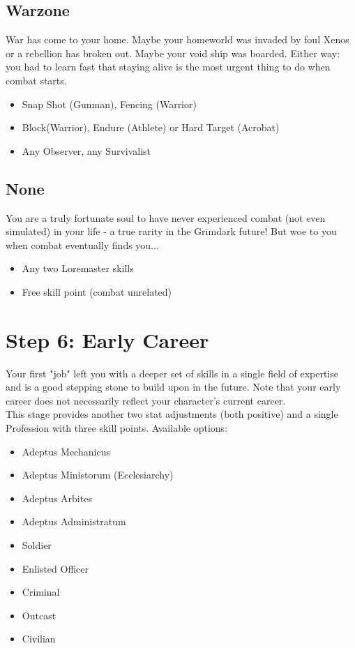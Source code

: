 	\subsection{Warzone}
	War has come to your home. Maybe your homeworld was invaded by foul Xenos or a rebellion has broken out. Maybe your void ship was boarded. Either way: you had to learn fast that staying alive is the most urgent thing to do when combat starts.
	\begin{itemize}
		\item Snap Shot (Gunman), Fencing (Warrior)
		\item Block(Warrior), Endure (Athlete) or Hard Target (Acrobat)
		\item Any Observer, any Survivalist
	\end{itemize}

	\subsection{None}
	You are a truly fortunate soul to have never experienced combat (not even simulated) in your life - a true rarity in the Grimdark future! But woe to you when combat eventually finds you...
	\begin{itemize}
		\item Any two Loremaster skills
		\item Free skill point (combat unrelated)
	\end{itemize}

\section{Step 6: Early Career} %
	\label{sec:lifepath_6_early_career}
	Your first "job" left you with a deeper set of skills in a single field of expertise and is a good stepping stone to build upon in the future. Note that your early career does not necessarily reflect your character's current career.\\
	This stage provides another two stat adjustments (both positive) and a single Profession with three skill points.
	Available options:
	\begin{itemize}
		\item Adeptus Mechanicus
		\item Adeptus Ministorum (Ecclesiarchy)
		\item Adeptus Arbites
		\item Adeptus Administratum
		\item Soldier
		\item Enlisted Officer
		\item Criminal
		\item Outcast
		\item Civilian
	\end{itemize}


